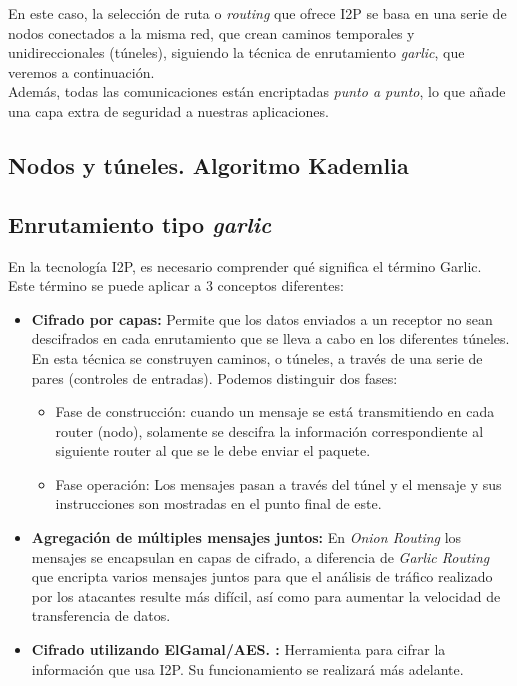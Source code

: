En este caso, la selección de ruta o \textit{routing} que ofrece I2P se basa en una serie de nodos conectados a la misma red, que crean caminos temporales y unidireccionales (túneles), siguiendo la técnica de enrutamiento \textit{garlic}, que veremos a continuación.\\

Además, todas las comunicaciones están encriptadas \textit{punto a punto}, lo que añade una capa extra de seguridad a nuestras aplicaciones.

\subsection{Nodos y túneles. Algoritmo Kademlia}






\subsection{Enrutamiento tipo \textit{garlic}}

En la tecnología I2P, es necesario comprender qué significa el término Garlic. Este término se puede aplicar a 3 conceptos diferentes:

\begin{itemize}
\item \textbf{Cifrado por capas:}
Permite que los datos enviados a un receptor no sean descifrados en cada enrutamiento que se lleva a cabo en los diferentes túneles. 
En esta técnica se construyen caminos, o túneles, a través de una serie de pares (controles de entradas). Podemos distinguir dos fases:


\begin{itemize}
	\item Fase de construcción: cuando un mensaje se está transmitiendo en cada router (nodo), solamente se descifra la información correspondiente al siguiente router al que se le debe enviar el paquete.
	\item 
	Fase  operación: Los mensajes pasan a través del túnel y el mensaje y sus instrucciones son mostradas en el punto final de este.
	
	
\end{itemize}	




\item \textbf{Agregación de múltiples mensajes juntos:}
En \textit{Onion Routing} los mensajes se encapsulan en capas de cifrado, a diferencia de \textit{Garlic Routing} que encripta varios mensajes juntos para que el análisis de tráfico realizado por los atacantes resulte más difícil, así como para aumentar la velocidad de transferencia de datos.


\item \textbf{Cifrado utilizando ElGamal/AES. :}
Herramienta para cifrar la información que usa I2P. Su funcionamiento se realizará más adelante.


\end{itemize}




